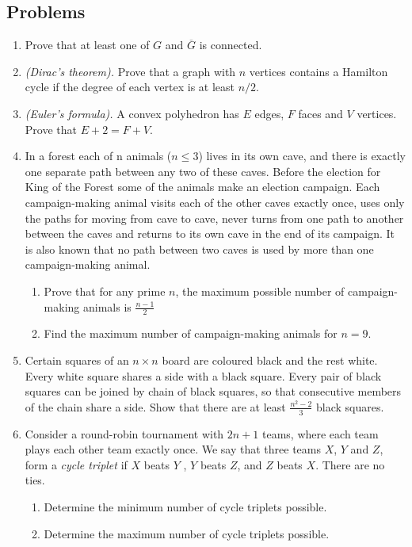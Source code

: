 \documentclass{article}
\begin{document}
\subsection*{Problems}
\begin{enumerate}
	\item
	Prove that at least one of $G$ and $\overline{G}$ is connected.
	
	\item 
	\emph{(Dirac's theorem).} Prove that a graph with $n$ vertices contains a Hamilton cycle if the degree of each vertex is at least $n/2$. 	
	
	\item 
	\emph{(Euler's formula).}  A convex polyhedron has $E$ edges, $F$ faces and $V$ vertices. Prove that $E+2=F+V$.

	\item %
	In a forest each of n animals ($n \leq 3$) lives in its own cave, and there is exactly one separate path
	between any two of these caves. Before the election for King of the Forest some of the animals
	make an election campaign. Each campaign-making animal visits each of the other caves exactly
	once, uses only the paths for moving from cave to cave, never turns from one path to another
	between the caves and returns to its own cave in the end of its campaign. It is also known that
	no path between two caves is used by more than one campaign-making animal.
	\begin{enumerate}
		\item Prove that for any prime $n$, the maximum possible number of campaign-making animals is $\tfrac{n-1}{2}$
		\item Find the maximum number of campaign-making animals for $n = 9$.	
	\end{enumerate}
	
	\item %
	Certain squares of an $n \times n$ board are coloured black and the rest white. Every white square shares a side with a black square. Every pair of black squares can be joined by chain of black squares, so that consecutive members of the chain share a side. Show that there are at least $\tfrac{n^2-2}{3}$ black squares.
	
	
	\item %
	Consider a round-robin tournament with $2n + 1$ teams, where each team plays each other team exactly once. We say
	that three teams $X$, $Y$ and $Z$, form a \emph{cycle triplet} if $X$ beats $Y$ , $Y$ beats $Z$, and $Z$ beats $X$. There are no ties.
	\begin{enumerate}
		\item Determine the minimum number of cycle triplets possible.
		\item Determine the maximum number of cycle triplets possible.
	\end{enumerate}
	 

\end{enumerate}
\end{document}
